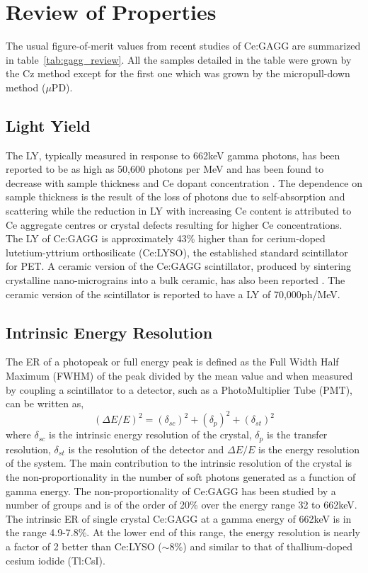 \documentclass[journal]{IEEEtran}
\begin{document}
\section{Review of Properties}

The usual figure-of-merit values from recent studies of Ce:GAGG are summarized in table~\ref{tab:gagg_review}. All the samples detailed in the table were grown by the Cz method except for the first one which was grown by the micropull-down method ($\mu$PD).

\subsection{Light Yield}
The LY, typically measured in response to 662keV gamma photons, has been reported to be as high as 50,600 photons per MeV \cite{prusa:lightyeild} and has been found to decrease with sample thickness \cite{prusa:lightyeild, sakthong:gagg} and Ce dopant concentration \cite{gagg:kamada03, prusa:lightyeild}. The dependence on sample thickness is the result of the loss of photons due to self-absorption and scattering while the reduction in LY with increasing Ce content is attributed to Ce aggregate centres or crystal defects resulting for higher Ce concentrations. 
The LY of Ce:GAGG is approximately 43\% higher than for cerium-doped lutetium-yttrium orthosilicate (Ce:LYSO), the established standard scintillator for PET. A ceramic version of the Ce:GAGG scintillator, produced by sintering crystalline nano-micrograins into a bulk ceramic, has also been reported \cite{yan:gagg}. The ceramic version of the scintillator is reported to have a LY of 70,000ph/MeV. 
  
\subsection{Intrinsic Energy Resolution}

The ER of a photopeak or full energy peak is defined as the Full Width Half Maximum (FWHM) of the peak divided by the mean value and when measured by coupling a scintillator to a detector, such as a PhotoMultiplier Tube (PMT), can be written as,
\begin{equation}
(\Delta{}E/E)^{2} = (\delta{}_{sc})^{2} + (\delta{}_{p})^{2} + (\delta{}_{st})^{2}
\end{equation}
\noindent{}where $\delta_{sc}$ is the intrinsic energy resolution of the crystal, $\delta{}_{p}$ is the transfer resolution, $\delta_{st}$ is the resolution of the detector and $\Delta{}E/E$ is the energy resolution of the system. The main contribution to the intrinsic resolution of the crystal is the non-proportionality in the number of soft photons generated as a function of gamma energy. The non-proportionality of Ce:GAGG has been studied by a number of groups and is of the order of 20\% over the energy range 32 to 662keV. The intrinsic ER of single crystal Ce:GAGG at a gamma energy of 662keV is in the range 4.9-7.8\%. At the lower end of this range, the energy resolution is nearly a factor of 2 better than Ce:LYSO ($\sim$8\%) and similar to that of thallium-doped cesium iodide (Tl:CsI).   
\end{document}
